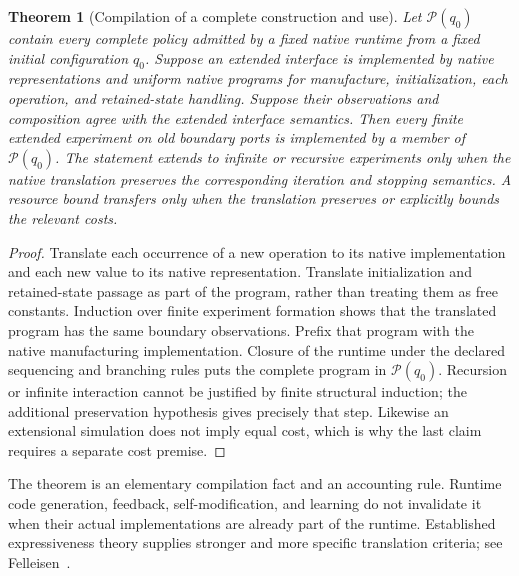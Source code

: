 \documentclass[11pt]{article}
\newtheorem{theorem}{Theorem}[section]
\theoremstyle{definition}
\theoremstyle{remark}
\begin{document}
\begin{theorem}[Compilation of a complete construction and use]\label{thm:closure}
Let $\mathcal P(q_0)$ contain every complete policy admitted by a fixed
native runtime from a fixed initial configuration $q_0$. Suppose an
extended interface is implemented by native representations and uniform
native programs for manufacture, initialization, each operation, and
retained-state handling. Suppose their observations and composition agree
with the extended interface semantics. Then every finite extended
experiment on old boundary ports is implemented by a member of
$\mathcal P(q_0)$. The statement extends to infinite or recursive
experiments only when the native translation preserves the corresponding
iteration and stopping semantics. A resource bound transfers only when
the translation preserves or explicitly bounds the relevant costs.
\end{theorem}
\begin{proof}
Translate each occurrence of a new operation to its native implementation
and each new value to its native representation. Translate initialization
and retained-state passage as part of the program, rather than treating
them as free constants. Induction over finite experiment formation shows
that the translated program has the same boundary observations. Prefix
that program with the native manufacturing implementation. Closure of the
runtime under the declared sequencing and branching rules puts the
complete program in $\mathcal P(q_0)$. Recursion or infinite interaction
cannot be justified by finite structural induction; the additional
preservation hypothesis gives precisely that step. Likewise an
extensional simulation does not imply equal cost, which is why the last
claim requires a separate cost premise.
\end{proof}

The theorem is an elementary compilation fact and an accounting rule.
Runtime code generation, feedback, self-modification, and learning do not
invalidate it when their actual implementations are already part of the
runtime. Established expressiveness theory supplies stronger and more
specific translation criteria; see Felleisen~\cite{Felleisen1991}.
\end{document}
